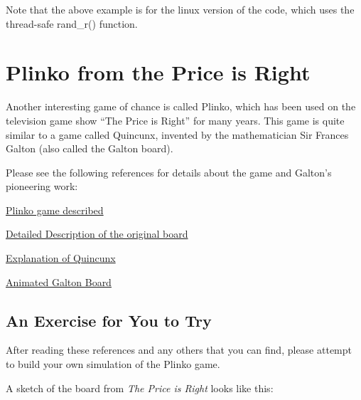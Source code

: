 \documentclass[letterpaper,10pt,openany,oneside]{sphinxmanual}
\begin{document}
Note that the above example is for the linux version of the code, which uses the thread-safe rand\_r() function.


\chapter{Plinko  from the Price is Right}
\label{Plinko/PlinkoGame:plinko-from-the-price-is-right}\label{Plinko/PlinkoGame::doc}
Another interesting game of chance is called Plinko, which has been used  on
the television game show ``The Price is Right'' for many years.  This game is quite similar to
a game called Quincunx, invented by the mathematician Sir Frances Galton (also called the Galton board).

Please see the following references for details about the game and Galton's pioneering work:

\href{http://www.mathdemos.org/mathdemos/plinko/}{Plinko game described}

\href{http://www.mathdemos.org/mathdemos/plinko/bigboardplinko.html}{Detailed Description of the original board}

\href{http://www.mathsisfun.com/data/quincunx-explained.html}{Explanation of Quincunx}

\href{http://www.mathsisfun.com/data/quincunx.html}{Animated Galton Board}


\section{An Exercise for You to Try}
\label{Plinko/PlinkoGame:an-exercise-for-you-to-try}
After reading these references and any others that you can find, please attempt to
build your own simulation of the Plinko game.

A sketch of the board from \emph{The Price is Right} looks like this:
\end{document}
